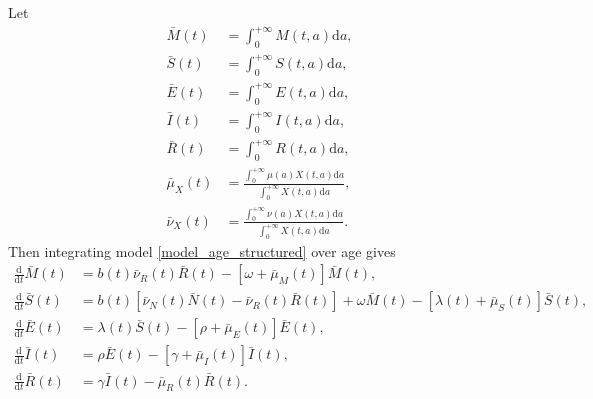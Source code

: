\documentclass[USenglish]{article}
\newcommand{\md}{\mathrm{d}}
\begin{document}
Let
\begin{subequations}
  \begin{align}
    \bar{M}(t) &= \int_0^{+\infty} M(t, a) \md a,
    \\
    \bar{S}(t) &= \int_0^{+\infty} S(t, a) \md a,
    \\
    \bar{E}(t) &= \int_0^{+\infty} E(t, a) \md a,
    \\
    \bar{I}(t) &= \int_0^{+\infty} I(t, a) \md a,
    \\
    \bar{R}(t) &= \int_0^{+\infty} R(t, a) \md a,
    \\
    \bar{\mu}_X(t)
    &= \frac{\int_0^{+\infty} \mu(a) X(t, a) \md a}
    {\int_0^{+\infty} X(t, a) \md a},
    \\
    \bar{\nu}_X(t)
    &= \frac{\int_0^{+\infty} \nu(a) X(t, a) \md a}
    {\int_0^{+\infty} X(t, a) \md a}.
  \end{align}
\end{subequations}
Then integrating model \eqref{model_age_structured} over age gives
\begin{subequations}
  \label{model_age_structured_agg_age}
  \begin{align}
    \frac{\md}{\md t} \bar{M}(t)
    &= b(t) \bar{\nu}_R(t) \bar{R}(t)
    - \left[\omega + \bar{\mu}_M(t)\right] \bar{M}(t),
    \\
    \frac{\md}{\md t} \bar{S}(t)
    &= b(t) \left[
      \bar{\nu}_N(t) \bar{N}(t)
      - \bar{\nu}_R(t) \bar{R}(t)
    \right]
    + \omega \bar{M}(t)
    - \left[\lambda(t) + \bar{\mu}_S(t)\right] \bar{S}(t),
    \\
    \frac{\md}{\md t} \bar{E}(t)
    &= \lambda(t) \bar{S}(t)
    - \left[\rho + \bar{\mu}_E(t)\right] \bar{E}(t),
    \\
    \frac{\md}{\md t} \bar{I}(t)
    &= \rho \bar{E}(t)
    - \left[\gamma + \bar{\mu}_I(t)\right] \bar{I}(t),
    \\
    \frac{\md}{\md t} \bar{R}(t)
    &= \gamma \bar{I}(t)
    - \bar{\mu}_R(t) \bar{R}(t).
  \end{align}
\end{subequations}
\end{document}
